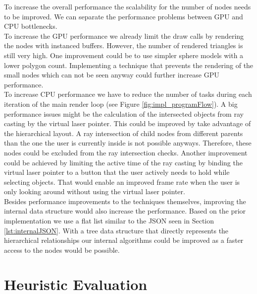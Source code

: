 To increase the overall performance the scalability for the number of nodes needs to be improved. We can separate the performance problems between GPU and CPU bottlenecks.
\\
To increase the GPU performance we already limit the draw calls by rendering the nodes with instanced buffers.
However, the number of rendered triangles is still very high. 
One improvement could be to use simpler sphere models with a lower polygon count. Implementing a technique that prevents the rendering of the small nodes which can not be seen anyway could further increase GPU performance.
\\
To increase CPU performance we have to reduce the number of tasks during each iteration of the main render loop (see Figure \ref{fig:impl_programFlow}).
A big performance issues might be the calculation of the intersected objects from ray casting by the virtual laser pointer. This could be improved by take advantage of the hierarchical layout. A ray intersection of child nodes from different parents than the one the user is currently inside is not possible anyways. Therefore, these nodes could be excluded from the ray intersection checks. 
Another improvement could be achieved by limiting the active time of the ray casting by binding the virtual laser pointer to a button that the user actively needs to hold while selecting objects. 
That would enable an improved frame rate when the user is only looking around without using the virtual laser pointer.
\\
Besides performance improvements to the techniques themselves, improving the internal data structure would also increase the performance. Based on the prior implementation we use a flat list similar to the JSON seen in Section \ref{lst:internalJSON}. With a tree data structure that directly represents the hierarchical relationships our internal algorithms could be improved as a faster access to the nodes would be possible.

\section{Heuristic Evaluation}
\label{sec:heuristicEvaluation}

